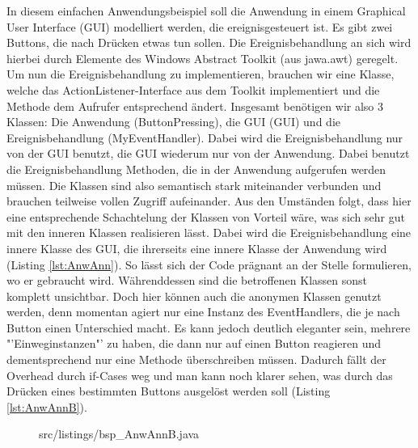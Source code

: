In diesem einfachen Anwendungsbeispiel soll die Anwendung in einem Graphical User Interface (GUI) modelliert werden, die ereignisgesteuert ist.
Es gibt zwei Buttons, die nach Drücken etwas tun sollen.
Die Ereignisbehandlung an sich wird hierbei durch Elemente des Windows Abstract Toolkit (aus jawa.awt) geregelt.
Um nun die Ereignisbehandlung zu implementieren, brauchen wir eine Klasse, welche das ActionListener-Interface aus dem Toolkit implementiert und die Methode dem Aufrufer entsprechend ändert.
Insgesamt benötigen wir also 3 Klassen: Die Anwendung (ButtonPressing), die GUI (GUI) und die Ereignisbehandlung (MyEventHandler). Dabei wird die Ereignisbehandlung nur von der GUI benutzt, die GUI wiederum nur von der Anwendung. Dabei benutzt die Ereignisbehandlung Methoden, die in der Anwendung aufgerufen werden müssen.
Die Klassen sind also semantisch stark miteinander verbunden und brauchen teilweise vollen Zugriff aufeinander.
Aus den Umständen folgt, dass hier eine entsprechende Schachtelung der Klassen von Vorteil wäre, was sich sehr gut mit den inneren Klassen realisieren lässt.
Dabei wird die Ereignisbehandlung eine innere Klasse des GUI, die ihrerseits eine innere Klasse der Anwendung wird (Listing \ref{lst:AnwAnn}).
So lässt sich der Code prägnant an der Stelle formulieren, wo er gebraucht wird.
Währenddessen sind die betroffenen Klassen sonst komplett unsichtbar.
Doch hier können auch die anonymen Klassen genutzt werden, denn momentan agiert nur eine Instanz des EventHandlers, die je nach Button einen Unterschied macht. Es kann jedoch deutlich eleganter sein, mehrere "'Einweginstanzen"' zu haben, die dann nur auf einen Button reagieren und dementsprechend nur eine Methode überschreiben müssen.
Dadurch fällt der Overhead durch if-Cases weg und man kann noch klarer sehen, was durch das Drücken eines bestimmten Buttons ausgelöst werden soll (Listing \ref{lst:AnwAnnB}).
\\
\begin{figure}[ht]
\lstset{language=Java}
 {src/listings/bsp_AnwAnnB.java}
\end{figure}
\newpage
